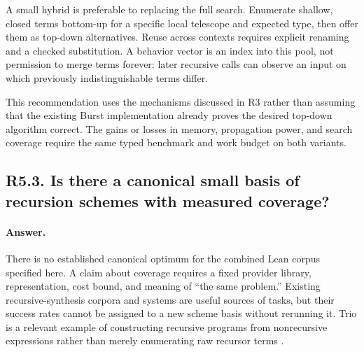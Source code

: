 \documentclass[11pt,a4paper]{article}
\newcommand{\answer}{\paragraph{Answer.}}
\theoremstyle{definition}
\theoremstyle{remark}
\begin{document}
A small hybrid is preferable to replacing the full search. Enumerate shallow,
closed terms bottom-up for a specific local telescope and expected type, then
offer them as top-down alternatives. Reuse across contexts requires explicit
renaming and a checked substitution. A behavior vector is an index into this
pool, not permission to merge terms forever: later recursive calls can observe
an input on which previously indistinguishable terms differ.

This recommendation uses the mechanisms discussed in R3 rather than assuming
that the existing Burst implementation already proves the desired top-down
algorithm correct. The gains or losses in memory, propagation power, and search
coverage require the same typed benchmark and work budget on both variants.

\subsection{R5.3. Is there a canonical small basis of recursion schemes with measured coverage?}
\answer There is no established canonical optimum for the combined Lean corpus
specified here. A claim about coverage requires a fixed provider library,
representation, cost bound, and meaning of ``the same problem.'' Existing
recursive-synthesis corpora and systems are useful sources of tasks, but their
success rates cannot be assigned to a new scheme basis without rerunning it.
Trio is a relevant example of constructing recursive programs from nonrecursive
expressions rather than merely enumerating raw recursor terms \cite{trio}.
\end{document}

